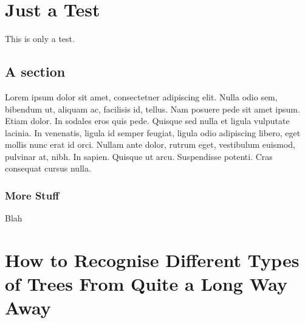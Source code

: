 \documentclass[10pt,chapterheads]{ucsd}
\begin{document}
%







%   
%   
%
\chapter{Just a Test}
This is only a test.
\section{A section}
Lorem ipsum dolor sit amet, consectetuer adipiscing elit. Nulla odio
sem, bibendum ut, aliquam ac, facilisis id, tellus. Nam posuere pede
sit amet ipsum. Etiam dolor. In sodales eros quis pede.  Quisque sed
nulla et ligula vulputate lacinia. In venenatis, ligula id semper
feugiat, ligula odio adipiscing libero, eget mollis nunc erat id orci.
Nullam ante dolor, rutrum eget, vestibulum euismod, pulvinar at, nibh.
In sapien. Quisque ut arcu. Suspendisse potenti. Cras consequat cursus
nulla.
\subsection{More Stuff}
Blah

\chapter{How to Recognise Different Types of Trees From Quite a Long Way Away}
\end{document}
